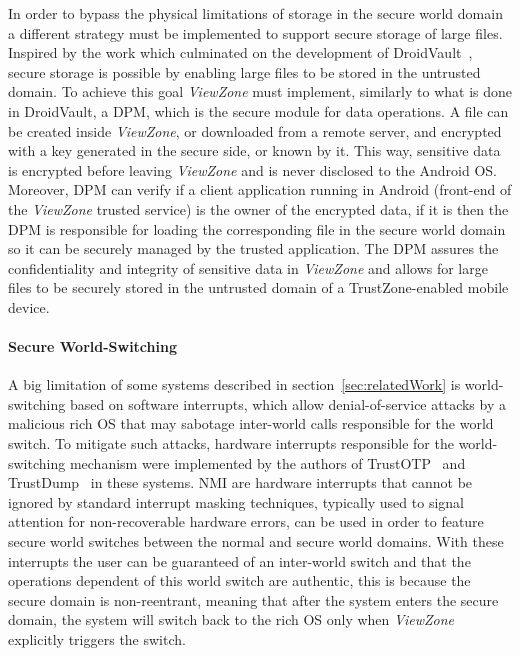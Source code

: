 In order to bypass the physical limitations of storage in the secure world domain a different strategy must be implemented to support secure storage of large files. Inspired by the work which culminated on the development of DroidVault~\cite{li2014droidvault}, secure storage is possible by enabling large files to be stored in the untrusted domain. To achieve this goal \emph{ViewZone} must implement, similarly to what is done in DroidVault, a \ac{DPM}, which is the secure module for data operations. A file can be created inside \emph{ViewZone}, or downloaded from a remote server, and encrypted with a key generated in the secure side, or known by it. This way, sensitive data is encrypted before leaving \emph{ViewZone} and is never disclosed to the Android OS. Moreover, \ac{DPM} can verify if a client application running in Android (front-end of the \emph{ViewZone} trusted service) is the owner of the encrypted data, if it is then the \ac{DPM} is responsible for loading the corresponding file in the secure world domain so it can be securely managed by the trusted application. The \ac{DPM} assures the confidentiality and integrity of sensitive data in \emph{ViewZone} and allows for large files to be securely stored in the untrusted domain of a TrustZone-enabled mobile device.

\paragraph{\textbf{Secure World-Switching}}

A big limitation of some systems described in section~\ref{sec:relatedWork} is world-switching based on software interrupts, which allow denial-of-service attacks by a malicious rich OS that may sabotage inter-world calls responsible for the world switch. To mitigate such attacks, hardware interrupts responsible for the world-switching mechanism were implemented by the authors of TrustOTP~\cite{sun2015trustotp} and TrustDump~\cite{sun2015reliable} in these systems. \ac{NMI} are hardware interrupts that cannot be ignored by standard interrupt masking techniques, typically used to signal attention for non-recoverable hardware errors, can be used in order to feature secure world switches between the normal and secure world domains. With these interrupts the user can be guaranteed of an inter-world switch and that the operations dependent of this world switch are authentic, this is because the secure domain is non-reentrant, meaning that after the system enters the secure domain, the system will switch back to the rich OS only when \emph{ViewZone} explicitly triggers the switch.


